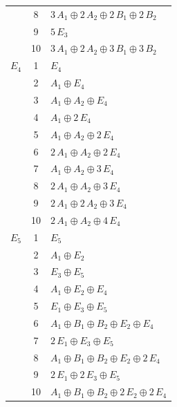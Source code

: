 \documentclass[11pt]{article}
\begin{document}
\begin{longtable}{l c p{}}
 & 8 & $3\,A_{1}\oplus 2\,A_{2}\oplus 2\,B_{1}\oplus 2\,B_{2}$\\
 & 9 & $5\,E_{3}$\\
 & 10 & $3\,A_{1}\oplus 2\,A_{2}\oplus 3\,B_{1}\oplus 3\,B_{2}$\\
\hline
$E_{4}$ & 1 & $E_{4}$\\
 & 2 & $A_{1}\oplus E_{4}$\\
 & 3 & $A_{1}\oplus A_{2}\oplus E_{4}$\\
 & 4 & $A_{1}\oplus 2\,E_{4}$\\
 & 5 & $A_{1}\oplus A_{2}\oplus 2\,E_{4}$\\
 & 6 & $2\,A_{1}\oplus A_{2}\oplus 2\,E_{4}$\\
 & 7 & $A_{1}\oplus A_{2}\oplus 3\,E_{4}$\\
 & 8 & $2\,A_{1}\oplus A_{2}\oplus 3\,E_{4}$\\
 & 9 & $2\,A_{1}\oplus 2\,A_{2}\oplus 3\,E_{4}$\\
 & 10 & $2\,A_{1}\oplus A_{2}\oplus 4\,E_{4}$\\
\hline
$E_{5}$ & 1 & $E_{5}$\\
 & 2 & $A_{1}\oplus E_{2}$\\
 & 3 & $E_{3}\oplus E_{5}$\\
 & 4 & $A_{1}\oplus E_{2}\oplus E_{4}$\\
 & 5 & $E_{1}\oplus E_{3}\oplus E_{5}$\\
 & 6 & $A_{1}\oplus B_{1}\oplus B_{2}\oplus E_{2}\oplus E_{4}$\\
 & 7 & $2\,E_{1}\oplus E_{3}\oplus E_{5}$\\
 & 8 & $A_{1}\oplus B_{1}\oplus B_{2}\oplus E_{2}\oplus 2\,E_{4}$\\
 & 9 & $2\,E_{1}\oplus 2\,E_{3}\oplus E_{5}$\\
 & 10 & $A_{1}\oplus B_{1}\oplus B_{2}\oplus 2\,E_{2}\oplus 2\,E_{4}$\\
\hline
\end{longtable}
\end{document}
